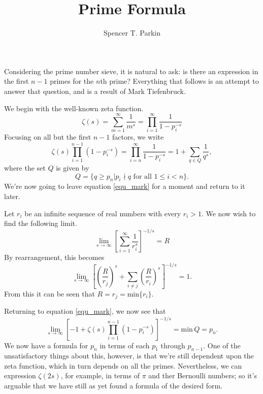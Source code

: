 \documentclass[12pt]{article}
\title{Prime Formula}
\author{Spencer T. Parkin}
\begin{document}
\maketitle

Considering the prime number sieve, it is natural to ask: is there an expression in the first $n-1$ primes for the $n$th prime?
Everything that follows is an attempt to answer that question, and is a result of Mark Tiefenbruck.

We begin with the well-known zeta function.
\begin{equation}\label{equ_euler}
\zeta(s) = \sum_{m=1}^\infty\frac{1}{m^s} = \prod_{i=1}^\infty\frac{1}{1-p_i^{-s}}
\end{equation}
Focusing on all but the first $n-1$ factors, we write
\begin{equation}\label{equ_mark}
\zeta(s)\prod_{i=1}^{n-1}(1-p_i^{-s}) = \prod_{i=n}^\infty\frac{1}{1-p_i^{-s}} = 1 + \sum_{q\in Q}\frac{1}{q^s},
\end{equation}
where the set $Q$ is given by
\begin{equation*}
Q = \{q\geq p_n|\mbox{$p_i\nmid q$ for all $1\leq i<n$}\}.
\end{equation*}
We're now going to leave equation \eqref{equ_mark} for a moment and return to it later.

Let $r_i$ be an infinite sequence of real numbers with every $r_i>1$.  We now wish to find the
following limit.
\begin{equation*}
\lim_{s\to\infty}\left[\sum_{i=1}^\infty\frac{1}{r_i^s}\right]^{-1/s} = R
\end{equation*}
By rearrangement, this becomes
\begin{equation*}
\lim_{s\to\infty}\left[\left(\frac{R}{r_j}\right)^s+\sum_{i\neq j}\left(\frac{R}{r_i}\right)^s\right]^{-1/s} = 1.
\end{equation*}
From this it can be seen that $R=r_j=\mbox{min}\{r_i\}$.

Returning to equation \eqref{equ_mark}, we now see that
\begin{equation*}
\lim_{s\to\infty}\left[-1+\zeta(s)\prod_{i=1}^{n-1}(1-p_i^{-s})\right]^{-1/s} = \mbox{min}\,Q = p_n.
\end{equation*}
We now have a formula for $p_n$ in terms of each $p_1$ through $p_{n-1}$.
One of the unsatisfactory things about this, however, is that we're still dependent upon the zeta function,
which in turn depends on all the primes.  Nevertheless, we can expression $\zeta(2s)$, for example,
in terms of $\pi$ and ther Bernoulli numbers; so it's arguable that we have still as yet found a formula
of the desired form.
\end{document}

